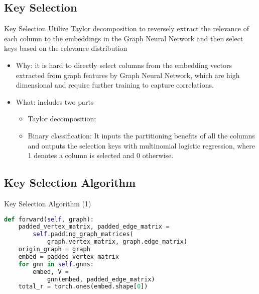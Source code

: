 \documentclass{beamer}
\begin{document}
\subsection{Key Selection}
\begin{frame}{Key Selection}
    Utilize Taylor decomposition to reversely extract the relevance of each column to the embeddings in the Graph Neural Network and then select keys based on the relevance distribution
    \vspace{0.3cm}
    \begin{itemize}
        \item Why: it is hard to directly select columns from the embedding vectors extracted from graph features by Graph Neural Network, which are high dimensional and require further training to capture correlations.
        \vspace{0.15cm}
        \item What: includes two parts
            \begin{itemize}
                \item Taylor decomposition;
                \item Binary classification: It inputs the partitioning benefits of all the columns and outputs the selection keys with multinomial logistic regression, where 1 denotes a column is selected and 0 otherwise.
            \end{itemize}
    \end{itemize}
\end{frame}

\subsection{Key Selection Algorithm}
\begin{frame}[fragile]{Key Selection Algorithm (1)}
    \begin{minipage}{1.045\linewidth}
\begin{lstlisting}[language=Python]
def forward(self, graph):
    padded_vertex_matrix, padded_edge_matrix = 
        self.padding_graph_matrices(
            graph.vertex_matrix, graph.edge_matrix)
    origin_graph = graph
    embed = padded_vertex_matrix
    for gnn in self.gnns:
        embed, V =
            gnn(embed, padded_edge_matrix)
    total_r = torch.ones(embed.shape[0])
\end{lstlisting}
    \end{minipage}
\end{frame} 
\end{document}
